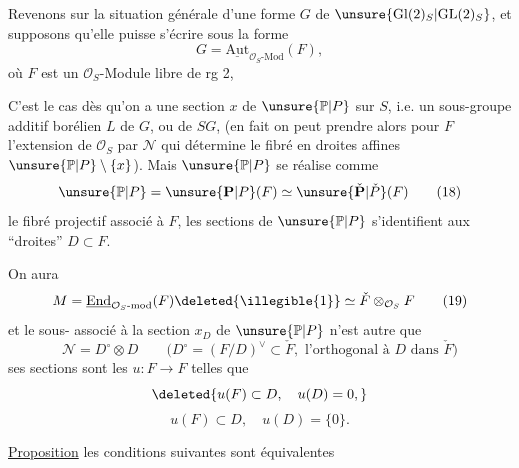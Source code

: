 

Revenons sur la situation générale d'une forme $G$ de $\unsure{\mathrm{Gl}(2)_S|\mathrm{GL}(2)_S}$, et supposons qu'elle puisse s'écrire sous la forme
\[
G=\underline{\mathrm{Aut}}_{\mathcal O_S\text{-Mod}}(F), \tag{17}
\]
où $F$ est un $\mathcal O_S$-Module  libre de rg 2,

C'est le cas dès qu'on a une section $x$ de $\unsure{\mathbb P|P}$ sur $S$, i.e. un sous-groupe additif borélien $L$ de $G$, ou de $SG$, (en fait on peut prendre alors pour $F$ l'extension de $\mathcal O_S$ par $\mathcal N$ qui détermine le fibré en droites affines $\unsure{\mathbb P|P}\setminus\{x\}$). Mais  $\unsure{\mathbb P|P}$ se réalise comme 
\[
\unsure{\mathbb P|P}=\unsure{\mathbf P|P}(F)\simeq\unsure{\check{\mathbf P}|\check P}(F) \tag{18}
\]
le fibré projectif associé à $F$,   les sections de $\unsure{\mathbb P|P}$ s'identifient aux ``droites'' $D\subset F$.

On aura
\[
M=\underline{\mathrm{End}}_{\mathcal O_S\text{-mod}}(F)\deleted{\illegible{1}}\simeq\check F\otimes_{\mathcal O_S}F \tag{19}
\]
et le sous-  associé à la section $x_D$ de $\unsure{\mathbb P|P}$  n'est autre que 
\[
\mathcal N=D^\circ\otimes D
\qquad\bigl(D^\circ=(F/D)^\vee\subset\check F,\text{ l'orthogonal à }D\text{ dans }\check F\bigr) \tag{20}
\]
ses sections sont les $u:F\longrightarrow F$ telles que
\[
\deleted{u(F)\subset D,\quad u(D)=0,}
\]
\[
u(F)\subset D,\quad u(D)=\{0\}. \tag{21}
\]


\uline{Proposition}   les conditions suivantes sont équivalentes

